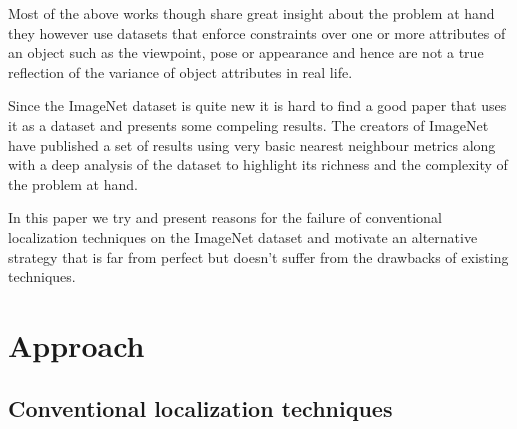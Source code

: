 \documentclass[10pt,twocolumn,letterpaper]{article}
\begin{document}
Most of the above works though share great insight about the problem at hand they however use datasets 
that enforce constraints over one or more attributes of an object such as the 
viewpoint, pose or appearance and hence are not a true reflection
of the variance of object attributes in real life.

Since the ImageNet dataset is quite new it is hard to find a good paper that uses it as a dataset and presents some
compeling results. The creators of ImageNet have published \cite{dataset1} a set of results using very basic nearest
neighbour metrics along with a deep analysis of the dataset to highlight its richness and the complexity of the problem at hand.

In this paper we try and present reasons for the failure of conventional localization techniques on the
ImageNet dataset and motivate an alternative strategy that is far from perfect but doesn't suffer from the
drawbacks of existing techniques.



\section{Approach}


\subsection{Conventional localization techniques}
\end{document}
